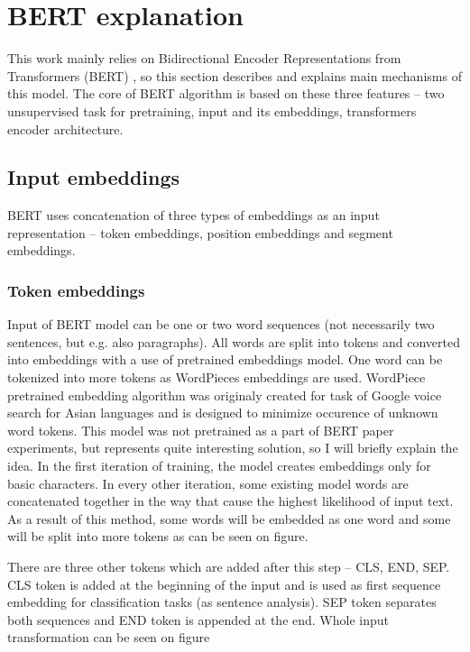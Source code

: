\section{BERT explanation}
This work mainly relies on Bidirectional Encoder Representations from Transformers (BERT)%
, so this section describes and explains main mechanisms of this model. 
The core of BERT algorithm is based on these three features -- two unsupervised task for pretraining, input and its embeddings, transformers encoder %
architecture.

\subsection{Input embeddings}
BERT uses concatenation of three types of embeddings as an input representation -- token embeddings, position embeddings and segment embeddings. %

\subsubsection*{Token embeddings}
Input of BERT model can be one or two word sequences (not necessarily two sentences, but e.g. also paragraphs). All words are split into tokens and converted into embeddings with a use of pretrained embeddings model. One word can be tokenized into more tokens as WordPieces %
embeddings are used. WordPiece pretrained embedding algorithm was originaly created for task of Google voice search for Asian languages and is designed to minimize occurence of unknown word tokens. This model was not pretrained as a part of BERT paper experiments, but represents quite interesting solution, so I will briefly explain the idea. In the first iteration of training, the model creates embeddings only for basic characters. In every other iteration, some existing model words are concatenated together in the way that cause the highest likelihood of input text. As a result of this method, some words will be embedded as one word and some will be split into more tokens as can be seen on figure. %
\par
There are three other tokens which are added after this step -- CLS, END, SEP. 
CLS token is added at the beginning of the input and is used as first sequence embedding for classification tasks (as sentence analysis). SEP token separates both sequences and END token is appended at the end. Whole input transformation can be seen on figure %

